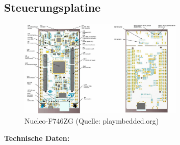\subsection{Steuerungsplatine}


\begin{figure}[!h]  %

	\centering\includegraphics[width=0.7\textwidth]{images/nucleo.jpg}
	\caption{Nucleo-F746ZG  \newline (Quelle: playmbedded.org)}
	\label{Nucleo}

\end{figure}


\textbf{Technische Daten:}

